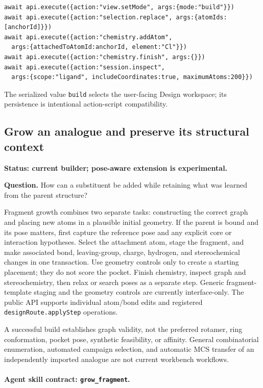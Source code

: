 \begin{small}
\begin{lstlisting}
await api.execute({action:"view.setMode", args:{mode:"build"}})
await api.execute({action:"selection.replace", args:{atomIds:[anchorId]}})
await api.execute({action:"chemistry.addAtom",
  args:{attachedToAtomId:anchorId, element:"Cl"}})
await api.execute({action:"chemistry.finish", args:{}})
await api.execute({action:"session.inspect",
  args:{scope:"ligand", includeCoordinates:true, maximumAtoms:200}})
\end{lstlisting}

The serialized value \texttt{build} selects the user-facing Design workspace; its persistence is intentional action-script compatibility.

\subsection{Grow an analogue and preserve its structural context}\label{appB:grow}

\textbf{Status: current builder; pose-aware extension is experimental.}

\textbf{Question.} How can a substituent be added while retaining what was learned from the parent structure?

Fragment growth combines two separate tasks: constructing the correct graph and placing new atoms in a plausible initial geometry. If the parent is bound and its pose matters, first capture the reference pose and any explicit core or interaction hypotheses. Select the attachment atom, stage the fragment, and make associated bond, leaving-group, charge, hydrogen, and stereochemical changes in one transaction. Use geometry controls only to create a starting placement; they do not score the pocket. Finish chemistry, inspect graph and stereochemistry, then relax or search poses as a separate step. Generic fragment-template staging and the geometry controls are currently interface-only. The public API supports individual atom/bond edits and registered \texttt{designRoute.applyStep} operations.

A successful build establishes graph validity, not the preferred rotamer, ring conformation, pocket pose, synthetic feasibility, or affinity. General combinatorial enumeration, automated campaign selection, and automatic MCS transfer of an independently imported analogue are not current workbench workflows.

\paragraph{Agent skill contract: \texttt{grow\_fragment}.}


\end{small}
